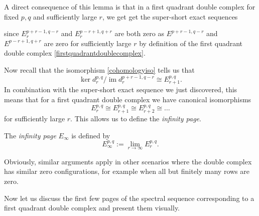 A direct consequence of this lemma is that in a first quadrant double complex for fixed $p,q$ and sufficiently large $r$, we get get the super-short exact sequences
\begin{center}
\end{center}
since $E_r^{p+r-1, q-r}$ and $E_r^{p-r+1, q+r}$ are both zero as $E^{p+r-1, q-r}$ and $E^{p-r+1, q+r}$ are zero for sufficiently large $r$ by definition of the first quadrant double complex \ref{firstquadrantdoublecomplex}.

Now recall that the isomorphism \ref{cohomologyiso} tells us that
\begin{equation*}
        \ker d_r^{p,q}/ \operatorname{im} d_r^{p+r-1, q-r} \cong  E_{r+1}^{p,q}.
    \end{equation*}
    In combination with the super-short exact sequence we just discovered, this means that for a first quadrant double complex we have canonical isomorphisms
    \begin{equation*}
        E_r^{p,q} \cong E^{p,q}_{r+1}\cong E_{r+2}^{p,q} \cong \dots
    \end{equation*}
    for sufficiently large $r$. This allows us to define the \textit{infinity page}.
\begin{definition}
The \textit{infinity page} $E_\infty$  is defined by
    \begin{equation*}\label{infinitypage}
        E_{\infty}^{p,q} := \lim_{r\to \infty} E_r^{p,q}.
    \end{equation*}
\end{definition}
\begin{remark}
    Obviously, similar arguments apply in other scenarios where the double complex has similar zero configurations, for example when all but finitely many rows are zero.
\end{remark}


Now let us discuss the first few pages of the spectral sequence corresponding to a first quadrant double complex and present them visually. 

